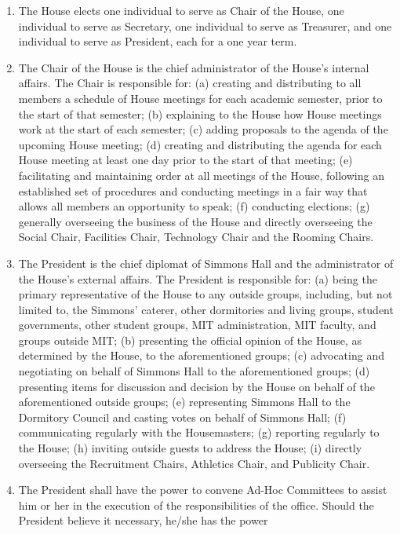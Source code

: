 \documentclass[letterpaper]{article}
\begin{document}
\begin{enumerate}
\begin{enumerate}
\begin{enumerate}
\item The House elects one individual to serve as Chair of the House,
one individual to serve as Secretary, one individual to serve as
Treasurer, and one individual to serve as President, each for a one
year term. 
\item The Chair of the House is the chief administrator of the
House{\textquoteright}s internal affairs. The Chair is responsible for:
(a) creating and distributing to all members a schedule of House
meetings for each academic semester, prior to the start of that
semester; (b) explaining to the House how House meetings work at the
start of each semester; (c) adding proposals to the agenda of the
upcoming House meeting; (d) creating and distributing the agenda for
each House meeting at least one day prior to the start of that meeting;
(e) facilitating and maintaining order at all meetings of the House,
following an established set of procedures and conducting meetings in a
fair way that allows all members an opportunity to speak; (f)
conducting elections; (g) generally overseeing the business of the
House and directly overseeing the Social Chair, Facilities Chair,
Technology Chair and the Rooming Chairs.
\item The President is the chief diplomat of Simmons Hall and the
administrator of the House{\textquoteright}s external affairs. The
President is responsible for: (a) being the primary representative of
the House to any outside groups, including, but not limited to, the
Simmons{\textquoteright} caterer, other dormitories and living groups,
student governments, other student groups, MIT administration, MIT
faculty, and groups outside MIT; (b) presenting the official opinion of
the House, as determined by the House, to the aforementioned groups;
(c) advocating and negotiating on behalf of Simmons Hall to the
aforementioned groups; (d) presenting items for discussion and decision
by the House on behalf of the aforementioned outside groups; (e)
representing Simmons Hall to the Dormitory Council and casting votes on
behalf of Simmons Hall; (f) communicating regularly with the
Housemasters; (g) reporting regularly to the House; (h) inviting
outside guests to address the House; (i) directly overseeing the
Recruitment Chairs, Athletics Chair, and Publicity Chair.
\item The President shall have the power to convene Ad-Hoc Committees to
assist him or her in the execution of the responsibilities of the
office. Should the President believe it necessary, he/she has the power

\end{enumerate}
\end{enumerate}
\end{enumerate}
\end{document}

